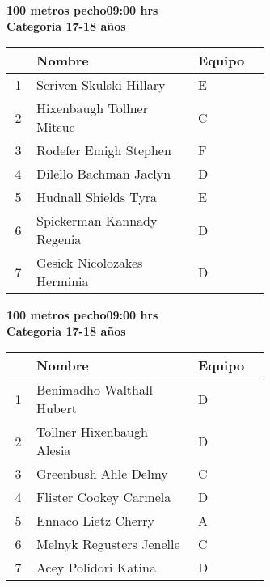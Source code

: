 \begin{minipage}{0.95\linewidth}\vspace{0.5cm} 
\begin{flushleft}
\textbf{
\hspace{-0.15cm}100 metros pecho\hspace{1.5cm}09:00 hrs \\Categoria 17-18 años}\vspace{-0.2cm} 
\end{flushleft}
\begin{tabular}{cp{0.63\linewidth}l}
\hline
& \textbf{Nombre} & \textbf{Equipo} \\ \hline
1 & Scriven Skulski Hillary & E \\ 
2 & Hixenbaugh Tollner Mitsue & C \\ 
3 & Rodefer Emigh Stephen & F \\ 
4 & Dilello Bachman Jaclyn & D \\ 
5 & Hudnall Shields Tyra & E \\ 
6 & Spickerman Kannady Regenia & D \\ 
7 & Gesick Nicolozakes Herminia & D \\ 
\end{tabular}
\end{minipage}
\begin{minipage}{0.95\linewidth}\vspace{0.5cm} 
\begin{flushleft}
\textbf{
\hspace{-0.15cm}100 metros pecho\hspace{1.5cm}09:00 hrs \\Categoria 17-18 años}\vspace{-0.2cm} 
\end{flushleft}
\begin{tabular}{cp{0.63\linewidth}l}
\hline
& \textbf{Nombre} & \textbf{Equipo} \\ \hline
1 & Benimadho Walthall Hubert & D \\ 
2 & Tollner Hixenbaugh Alesia & D \\ 
3 & Greenbush Ahle Delmy & C \\ 
4 & Flister Cookey Carmela & D \\ 
5 & Ennaco Lietz Cherry & A \\ 
6 & Melnyk Regusters Jenelle & C \\ 
7 & Acey Polidori Katina & D \\ 
\end{tabular}
\end{minipage}
